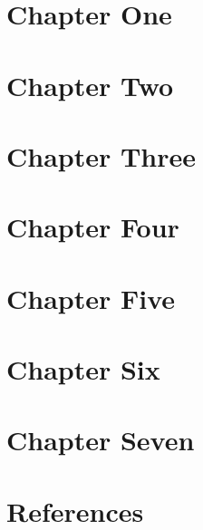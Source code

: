 
\chapter{Chapter One}
\thispagestyle{fancy}
\bigskip


\clearpage
\chapter{Chapter Two}
\thispagestyle{fancy}
\bigskip


\clearpage
\chapter{Chapter Three}
\thispagestyle{fancy}
\bigskip


\clearpage
\chapter{Chapter Four}
\thispagestyle{fancy}
\bigskip


\clearpage
\chapter{Chapter Five}
\thispagestyle{fancy}
\bigskip


\clearpage
\chapter{Chapter Six}
\thispagestyle{fancy}
\bigskip


\clearpage
\chapter{Chapter Seven}
\thispagestyle{fancy}
\bigskip



\clearpage
\chapter{References}
\thispagestyle{fancy}
\printbibliography





